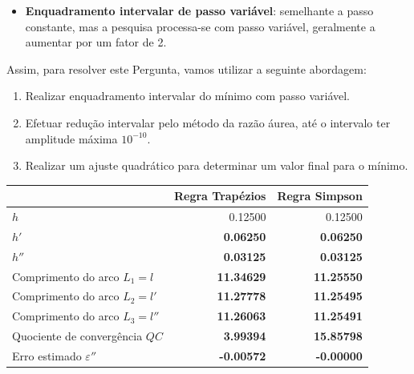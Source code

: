 {\begin{itemize}
    \item \textbf{Enquadramento intervalar de passo variável}: semelhante a passo constante, mas a pesquisa processa-se com passo variável, geralmente a aumentar por um fator de 2.
\end{itemize}
Assim, para resolver este Pergunta, vamos utilizar a seguinte abordagem:
\begin{enumerate}
    \item Realizar enquadramento intervalar do mínimo com passo variável.
    \item Efetuar redução intervalar pelo método da razão áurea, até o intervalo ter amplitude máxima $10^{-10}$.
    \item Realizar um ajuste quadrático para determinar um valor final para o mínimo.
\end{enumerate}




\begin{center} \begin{tabular}{l | r | r}
    & Regra Trapézios & Regra Simpson \\ \hline
    $h  $ & 0.12500 & 0.12500 \\
    $h' $ & \textbf{0.06250} & \textbf{0.06250} \\
    $h''$ & \textbf{0.03125} & \textbf{0.03125} \\
    Comprimento do arco $L_1=l  $ & \textbf{11.34629} & \textbf{11.25550} \\
    Comprimento do arco $L_2=l' $ & \textbf{11.27778} & \textbf{11.25495} \\
    Comprimento do arco $L_3=l''$ & \textbf{11.26063} & \textbf{11.25491} \\
    Quociente de convergência $QC$ & \textbf{3.99394} & \textbf{15.85798} \\
    Erro estimado $\varepsilon''$ & \textbf{-0.00572} & \textbf{-0.00000}
\end{tabular} \end{center}

}

